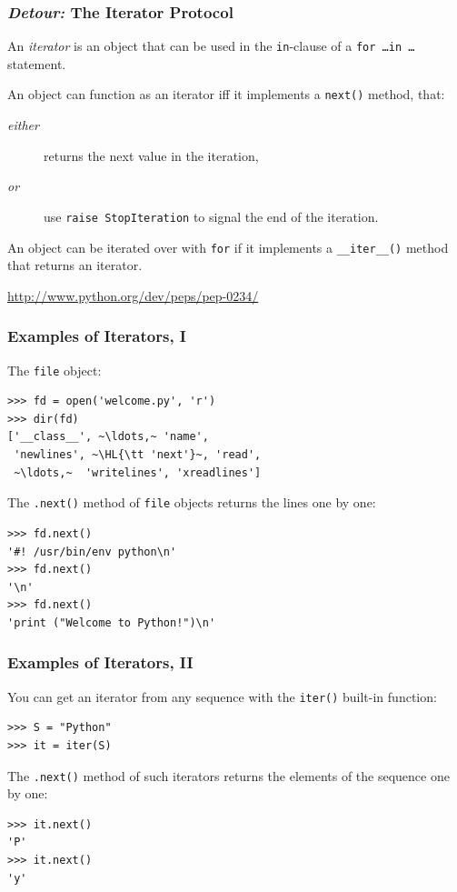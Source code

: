 \documentclass[english,serif,mathserif,xcolor=pdftex,dvipsnames,table]{beamer}
\begin{document}
\begin{frame}[fragile]
  \frametitle{\emph{Detour:} The Iterator Protocol}

  An \emph{iterator} is an object that can be used in the
  \texttt{in}-clause of a \texttt{for \ldots in \ldots} statement.

  \+
  An object can function as an iterator iff it implements a
  \texttt{next()} method, that:
  \begin{description}
  \item[\emph{either}] returns the next value in the iteration,
  \item[\emph{or}] use \lstinline|raise StopIteration| to signal the
    end of the iteration.
  \end{description}

  \+
  An object can be iterated over with \lstinline|for| if it implements a
  \lstinline|__iter__()| method that returns an iterator.

  \begin{references}
    \url{http://www.python.org/dev/peps/pep-0234/}
  \end{references}
\end{frame}


\begin{frame}[fragile]
  \frametitle{Examples of Iterators, I}

  The \texttt{file} object:
\begin{lstlisting}
>>> fd = open('welcome.py', 'r')
>>> dir(fd)
['__class__', ~\ldots,~ 'name',
 'newlines', ~\HL{\tt 'next'}~, 'read',
 ~\ldots,~  'writelines', 'xreadlines']
\end{lstlisting}

  \+
  The \texttt{.next()} method of \texttt{file} objects returns the
  lines one by one:
\begin{lstlisting}
>>> fd.next()
'#! /usr/bin/env python\n'
>>> fd.next()
'\n'
>>> fd.next()
'print ("Welcome to Python!")\n'
\end{lstlisting}

\end{frame}


\begin{frame}[fragile]
  \frametitle{Examples of Iterators, II}

  You can get an iterator from any sequence with the \texttt{iter()} built-in function:
\begin{lstlisting}
>>> S = "Python"
>>> it = iter(S)
\end{lstlisting}

  \+
  The \texttt{.next()} method of such iterators returns the
  elements of the sequence one by one:
\begin{lstlisting}
>>> it.next()
'P'
>>> it.next()
'y'
\end{lstlisting}
\end{frame}
\end{document}
